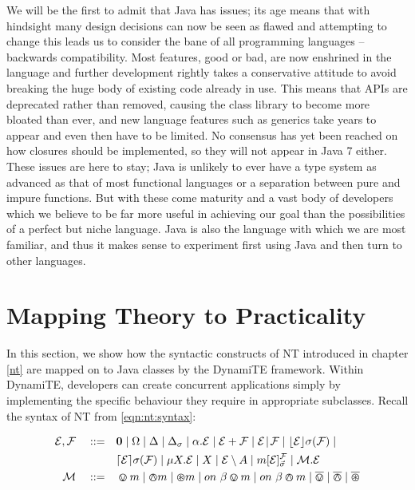 We will be the first to admit that Java has issues; its age means that
with hindsight many design decisions can now be seen as flawed and
attempting to change this leads us to consider the bane of all
programming languages -- backwards compatibility.  Most features, good
or bad, are now enshrined in the language and further development
rightly takes a conservative attitude to avoid breaking the huge body
of existing code already in use.  This means that APIs are deprecated
rather than removed, causing the class library to become more bloated
than ever, and new language features such as generics take years to
appear and even then have to be limited.  No consensus has yet been
reached on how closures should be implemented, so they will not appear
in Java 7 either.  These issues are here to stay; Java is unlikely to
ever have a type system as advanced as that of most functional
languages or a separation between pure and impure functions.  But with
these come maturity and a vast body of developers which we believe to
be far more useful in achieving our goal than the possibilities of a
perfect but niche language.  Java is also the language with which we
are most familiar, and thus it makes sense to experiment first using
Java and then turn to other languages.

\section{Mapping Theory to Practicality}
\label{dyn:maptheory}

In this section, we show how the syntactic constructs of NT introduced
in chapter \ref{nt} are mapped on to Java classes by the DynamiTE
framework.  Within DynamiTE, developers can create concurrent
applications simply by implementing the specific behaviour they
require in appropriate subclasses.  Recall the syntax of NT from
\ref{eqn:nt:syntax}:

\begin{equation}
  \begin{aligned}
    \text{$\mathcal{E}$}, \text{$\mathcal{F}$} \quad \mathrel{::=} \quad &
      \textbf{0}  \mid
      \Omega \mid
      \Delta \mid
      \Delta_{\sigma} \mid
      \alpha . \text{$\mathcal{E}$}  \mid
      \text{$\mathcal{E}$} + \text{$\mathcal{F}$} \mid
      \text{$\mathcal{E}$} \mathrel{\!|\!} \text{$\mathcal{F}$} \mid
      \lfloor{\text{$\mathcal{E}$}}\rfloor {\sigma} ({\text{$\mathcal{F}$}}) \mid \\
    & \lceil{\text{$\mathcal{E}$}}\rceil {\sigma} ({\text{$\mathcal{F}$}}) \mid 
      \mu X . \text{$\mathcal{E}$} \mid
      X \mid 
      \text{$\mathcal{E}$} \setminus {A} \mid
      {m}[ \text{$\mathcal{E}$} ]^{\text{$\mathcal{F}$}}_{\vec{\sigma}} \mid
      \text{$\mathcal{M}$} . \text{$\mathcal{E}$} \\
   \text{$\mathcal{M}$} \quad \mathrel{::=} \quad & \varovee m \mid \varowedge m \mid \varoast m \mid
      on\ \beta \varovee m \mid on\ \beta \varowedge m \mid \overline{\varovee} \mid
      \overline{\varowedge} \mid \overline{\varoast}
   \end{aligned}
\end{equation}

